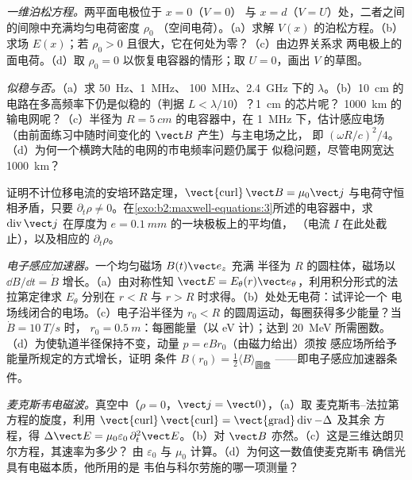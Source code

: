 \begin{exercise}[$\star\star$]\label{exo:b2:maxwell-equations:7}
\emph{一维泊松方程。}两平面电极位于 $x = 0$（$V = 0$）
与 $x = d$（$V = U$）处，二者之间的间隙中充满均匀电荷密度 $\rho_0$
（空间电荷）。（a）求解 $V(x)$ 的泊松方程。（b）求场
$E(x)$；若 $\rho_0 > 0$ 且很大，它在何处为零？（c）由边界关系求
两电极上的面电荷。（d）取 $\rho_0 = 0$
以恢复电容器的情形；取 $U = 0$，画出 $V$ 的草图。
\end{exercise}

\begin{exercise}[$\star\star$]\label{exo:b2:maxwell-equations:8}
\emph{似稳与否。}（a）求 \qty{50}{Hz}、\qty{1}{MHz}、
\qty{100}{MHz}、\qty{2.4}{GHz} 下的 $\lambda$。（b）\qty{10}{cm}
的电路在多高频率下仍是似稳的（判据 $L < \lambda/10$）？\qty{1}{cm} 的芯片呢？
\qty{1000}{km} 的输电网呢？（c）半径为 $R = \qty{5}{cm}$ 的电容器中，在
\qty{1}{MHz} 下，估计感应电场（由前面练习中随时间变化的 $\vect B$ 产生）与主电场之比，
即 $(\omega R/c)^2
/4$。（d）为何一个横跨大陆的电网的市电频率问题仍属于
似稳问题，尽管电网宽达 \qty{1000}{km}？
\end{exercise}

\begin{exercise}[$\star\star$]\label{exo:b2:maxwell-equations:9}
证明不计位移电流的安培环路定理，$\operatorname{\vect{curl}}
\vect B = \mu_0\vect j$ 与电荷守恒相矛盾，只要 $\partial_t\rho
\ne 0$。在\cref{exo:b2:maxwell-equations:3}所述的电容器中，求
$\operatorname{div}\vect j$ 在厚度为 $e = \qty{0.1}{mm}$ 的一块极板上的平均值，
（电流 $I$ 在此处截止），以及相应的 $\partial_t\rho$。
\end{exercise}

\begin{exercise}[$\star\star\star$]\label{exo:b2:maxwell-equations:10}
\emph{电子感应加速器。}一个均匀磁场 $B(t)\vect e_z$ 充满
半径为 $R$ 的圆柱体，磁场以 $\dd B/\dd t = \dot B$ 增长。（a）由对称性知
$\vect E = E_\theta(r)\vect e_\theta$，利用积分形式的法拉第定律求 $E_\theta$
分别在 $r < R$ 与 $r > R$ 时求得。（b）处处无电荷：试评论一个
电场线闭合的电场。（c）电子沿半径为
$r_0 < R$ 的圆周运动，每圈获得多少能量？当 $\dot B = \qty{10}{T/s}$ 时，
$r_0 = \qty{0.5}{m}$：每圈能量（以 eV 计）；达到 \qty{20}{MeV} 所需圈数。
（d）为使轨道半径保持不变，动量 $p = eBr_0$（由磁力给出）须按
感应场所给予能量所规定的方式增长，证明
条件 $B(r_0) = \tfrac12\langle B\rangle_{\text{圆盘}}$
——即电子感应加速器条件。
\end{exercise}

\begin{exercise}[$\star\star\star$]\label{exo:b2:maxwell-equations:11}
\emph{麦克斯韦电磁波。}真空中（$\rho = 0$，$\vect j = \vect 0$），（a）取
麦克斯韦–法拉第方程的旋度，利用 $\operatorname{\vect{curl}}
\operatorname{\vect{curl}} = \operatorname{\vect{grad}}\operatorname{div} - \Delta$ 及其余
方程，得 $\Delta\vect E = \mu_0\varepsilon_0\,\partial_t^2\vect E$。（b）对
$\vect B$ 亦然。（c）这是三维达朗贝尔方程，其速率为多少？
由 $\varepsilon_0$ 与 $\mu_0$ 计算。（d）为何这一数值使麦克斯韦
确信光具有电磁本质，他所用的是
韦伯与科尔劳施的哪一项测量？
\end{exercise}

